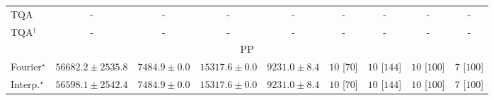 \begin{tabular}{l|cccc|cccc|}
TQA & {\cellcolor[HTML]{000000}} \color[HTML]{F1F1F1} {\cellcolor{white}} \color{black} - & {\cellcolor[HTML]{000000}} \color[HTML]{F1F1F1} {\cellcolor{white}} \color{black} - & {\cellcolor[HTML]{000000}} \color[HTML]{F1F1F1} {\cellcolor{white}} \color{black} - & {\cellcolor[HTML]{000000}} \color[HTML]{F1F1F1} {\cellcolor{white}} \color{black} - & {\cellcolor[HTML]{000000}} \color[HTML]{F1F1F1} {\cellcolor{white}} \color{black} - & {\cellcolor[HTML]{000000}} \color[HTML]{F1F1F1} {\cellcolor{white}} \color{black} - & {\cellcolor[HTML]{000000}} \color[HTML]{F1F1F1} {\cellcolor{white}} \color{black} - & {\cellcolor[HTML]{000000}} \color[HTML]{F1F1F1} {\cellcolor{white}} \color{black} - \\
TQA$^\dagger$ & {\cellcolor[HTML]{000000}} \color[HTML]{F1F1F1} {\cellcolor{white}} \color{black} - & {\cellcolor[HTML]{000000}} \color[HTML]{F1F1F1} {\cellcolor{white}} \color{black} - & {\cellcolor[HTML]{000000}} \color[HTML]{F1F1F1} {\cellcolor{white}} \color{black} - & {\cellcolor[HTML]{000000}} \color[HTML]{F1F1F1} {\cellcolor{white}} \color{black} - & {\cellcolor[HTML]{000000}} \color[HTML]{F1F1F1} {\cellcolor{white}} \color{black} - & {\cellcolor[HTML]{000000}} \color[HTML]{F1F1F1} {\cellcolor{white}} \color{black} - & {\cellcolor[HTML]{000000}} \color[HTML]{F1F1F1} {\cellcolor{white}} \color{black} - & {\cellcolor[HTML]{000000}} \color[HTML]{F1F1F1} {\cellcolor{white}} \color{black} - \\
\cline{1-9}
\multicolumn{9}{c}{\rule{0pt}{8pt}PP} \\
\midrule
Fourier$^\star$ & {\cellcolor[HTML]{004529}} \color[HTML]{F1F1F1} $56682.2\pm 2535.8$ & {\cellcolor[HTML]{FEFFE1}} \color[HTML]{000000} $7484.9\pm 0.0$ & {\cellcolor[HTML]{EDF8B1}} \color[HTML]{000000} $15317.6\pm 0.0$ & {\cellcolor[HTML]{FCFED4}} \color[HTML]{000000} $9231.0\pm 8.4$ & {\cellcolor[HTML]{49006A}} \color[HTML]{F1F1F1} $10$ [$70$] & {\cellcolor[HTML]{49006A}} \color[HTML]{F1F1F1} $10$ [$144$] & {\cellcolor[HTML]{49006A}} \color[HTML]{F1F1F1} $10$ [$100$] & {\cellcolor[HTML]{CD238F}} \color[HTML]{F1F1F1} $7$ [$100$] \\
Interp.$^\star$ & {\cellcolor[HTML]{004529}} \color[HTML]{F1F1F1} $56598.1\pm 2542.4$ & {\cellcolor[HTML]{FEFFE1}} \color[HTML]{000000} $7484.9\pm 0.0$ & {\cellcolor[HTML]{EDF8B1}} \color[HTML]{000000} $15317.6\pm 0.0$ & {\cellcolor[HTML]{FCFED4}} \color[HTML]{000000} $9231.0\pm 8.4$ & {\cellcolor[HTML]{49006A}} \color[HTML]{F1F1F1} $10$ [$70$] & {\cellcolor[HTML]{49006A}} \color[HTML]{F1F1F1} $10$ [$144$] & {\cellcolor[HTML]{49006A}} \color[HTML]{F1F1F1} $10$ [$100$] & {\cellcolor[HTML]{CD238F}} \color[HTML]{F1F1F1} $7$ [$100$] \\

\end{tabular}
